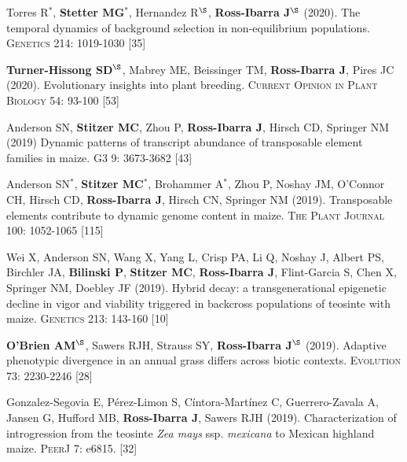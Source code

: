 \documentclass[letterpaper,10pt]{article}
\begin{document}
\begin{etaremune}
\item Torres R$^*$, \textbf{Stetter MG}$^*$, Hernandez R$^\S$, \textbf{Ross-Ibarra J}$^\S$ (2020). The temporal dynamics of background selection in non-equilibrium populations. \textsc{Genetics} 214: 1019-1030
 [35]\\

\item \textbf{Turner-Hissong SD}$^\S$, Mabrey ME, Beissinger TM, \textbf{Ross-Ibarra J}, Pires JC (2020). Evolutionary insights into plant breeding. \textsc{Current Opinion in Plant Biology} 54: 93-100
 [53]\\

\item  Anderson SN, \textbf{Stitzer MC},  Zhou P, \textbf{Ross-Ibarra J}, Hirsch CD, Springer NM (2019) Dynamic patterns of transcript abundance of transposable element families in maize. \textsc{G3} 9: 3673-3682
 [43]\\

\item  Anderson SN$^*$, \textbf{Stitzer MC}$^*$,  Brohammer A$^*$, Zhou P, Noshay JM,  O'Connor CH, Hirsch CD, \textbf{Ross-Ibarra J}, Hirsch CN, Springer NM (2019). Transposable elements contribute to dynamic genome content in maize. \textsc{The Plant Journal} 100: 1052-1065
 [115]\\

\item Wei X,  Anderson SN,  Wang X,  Yang L, Crisp PA,  Li Q,  Noshay J, Albert PS, Birchler JA,  \textbf{Bilinski P}, \textbf{Stitzer MC}, \textbf{Ross-Ibarra J},  Flint-Garcia S,  Chen X,  Springer NM, Doebley JF (2019). Hybrid decay: a transgenerational epigenetic decline in vigor and viability triggered in backcross populations of teosinte with maize. \textsc{Genetics} 213: 143-160
 [10]\\

\item \textbf{O'Brien AM}$^\S$, Sawers RJH, Strauss SY, \textbf{Ross-Ibarra J}$^\S$ (2019). Adaptive phenotypic divergence in an annual grass differs across biotic contexts. \textsc{Evolution} 73: 2230-2246
 [28]\\

\item  Gonzalez-Segovia E,  P\'erez-Limon S,  C\'intora-Mart\'inez C,  Guerrero-Zavala A,  Jansen G,  Hufford MB, \textbf{Ross-Ibarra J}, Sawers RJH (2019). Characterization of introgression from the teosinte \textit{Zea mays} ssp. \textit{mexicana} to Mexican highland maize. \textsc{PeerJ} 7: e6815. %
 [32]\\


\end{etaremune}
\end{document}
